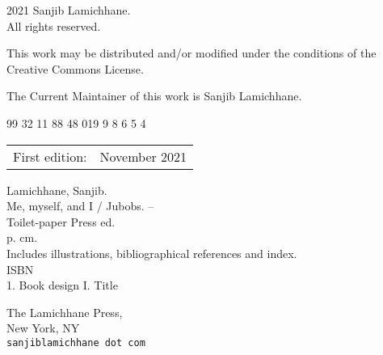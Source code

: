 \begin{titlepage}
	\maketitle
	\pagestyle{empty}
	\begingroup
	\footnotesize
	\parindent 0pt
	\parskip \baselineskip
	\textcopyright{} 2021 Sanjib Lamichhane. \\
	All rights reserved.
	
	This work may be distributed and/or modified under the conditions
	of the Creative Commons License.
	
	The Current Maintainer of this work is Sanjib Lamichhane.
	
	\lipsum[10]
	
	\begin{center}
		99 32 11 88 48 01\hspace{2em}9 9 8 6 5 4 %
	\end{center}
	
	\begin{center}
		\begin{tabular}{ll}
			First edition:  & November 2021 \\
		\end{tabular}
	\end{center}
	
	\vfill
	
	Lamichhane, Sanjib.\\
	\hspace*{2em} Me, myself, and I / Jubobs. -- \\
	\hspace*{1em} Toilet-paper Press ed. \\
	\hspace*{2em} p. \hspace*{2em} cm. \\
	\hspace*{2em} Includes illustrations, bibliographical references and index. \\
	\hspace*{2em} ISBN \\
	\hspace*{2em} 1. Book design \hspace*{2em} I. Title
	
	
	\vfill
	
	The Lamichhane Press, \\
	New York, NY \\
	\texttt{sanjiblamichhane dot com}
	
	\vspace*{2\baselineskip}
	
	
	\endgroup
	\clearpage
\end{titlepage}